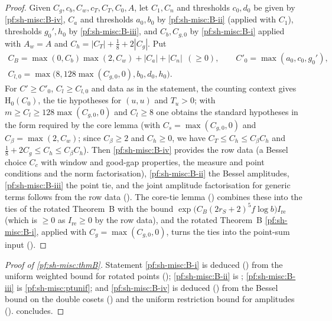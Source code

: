 \begin{proof}
Given $C_g,c_b,C_w,c_T,C_T,C_0,A$, let $C_1,C_n$ and thresholds $c_0,d_0$ be given by \ref{pf:sh-misc:B-iv}, $C_a$ and thresholds $a_0,b_0$
by \ref{pf:sh-misc:B-ii} (applied with $C_1$), thresholds $g_0',h_0$ by \ref{pf:sh-misc:B-iii}, and $C_b,C_{g,0}$ by \ref{pf:sh-misc:B-i}
applied with $A_w=A$ and $C_h=|C_T|+\frac18+2|C_g|$. Put
\begin{gather*}
C_B=\max(0,C_b)\max(2,C_w)+|C_a|+|C_n|\ \ (\ge0),\qquad C'_0=\max(a_0,c_0,g_0'),\\
C_{l,0}=\max\bigl(8,128\max(C_{g,0},0),b_0,d_0,h_0\bigr).
\end{gather*}
For $C'\ge C'_0$, $C_l\ge C_{l,0}$ and data as in the statement, the counting context gives $\mathrm{H}_0(C_0)$, the tie
hypotheses for $(u,u)$ and $T_u>0$; with $m\ge C_l\ge128\max(C_{g,0},0)$ and $C_l\ge8$ one obtains the standard hypotheses
in the form required by the core lemma (with $C_s=\max(C_{g,0},0)$ and $C_\beta=\max(2,C_w)$; since $C_\beta\ge2$ and $C_h\ge0$, we have
$C_T\le C_h\le C_\beta C_h$ and $\frac18+2C_g\le C_h\le C_\beta C_h$). Then \ref{pf:sh-misc:B-iv} provides the row data (a Bessel choice
$C_c$ with window and good-gap properties, the measure and point conditions and the norm factorisation), \ref{pf:sh-misc:B-ii} the
Bessel amplitudes, \ref{pf:sh-misc:B-iii} the point tie, and the joint amplitude factorisation for generic terms follows from the row
data (). The core-tie lemma
() combines these into the ties of the rotated Theorem~B with the bound
$\exp\bigl(C_B(2r_S+2)^5f\log b\bigr)I_{\mathrm{re}}$ (which is $\ge0$ as $I_{\mathrm{re}}\ge0$ by the row data), and the rotated
Theorem~B \ref{pf:sh-misc:B-i}, applied with $C_g=\max(C_{g,0},0)$, turns the ties into the point-sum input
().
\end{proof}

\begin{proof}[Proof of \cref{pf:sh-misc:thmB}]
Statement \ref{pf:sh-misc:B-i} is deduced () from the uniform
weighted bound for rotated points (); \ref{pf:sh-misc:B-ii} is
; \ref{pf:sh-misc:B-iii} is \cref{pf:sh-misc:ptunif}; and \ref{pf:sh-misc:B-iv} is deduced
() from the Bessel bound on the double cosets
() and the uniform restriction bound for amplitudes
().  concludes.
\end{proof}

